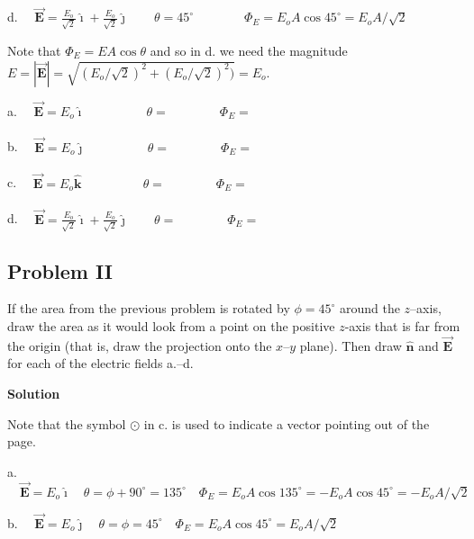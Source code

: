 \documentclass{article}
\newcommand{\ds}[0]{\displaystyle}
\newcommand{\ihat}[0]{\hat{\boldsymbol{\imath}}}
\newcommand{\jhat}[0]{\hat{\boldsymbol{\jmath}}}
\newcommand{\khat}[0]{\hat{\boldsymbol{k}}}
\newcommand{\bfvec}[1]{\vec{\mathbf{#1}}}
\begin{document}
\begin{enumerate}
        d. $\quad\ds\bfvec{E}=\frac{E_o}{\sqrt{2}}\ihat + \frac{E_o}{\sqrt{2}}\jhat\qquad\theta=45^\circ\qquad\qquad\Phi_E=E_o A\cos 45^\circ=E_oA/\sqrt{2}$

        Note that $\Phi_E=EA\cos\theta$ and so in d. we need the magnitude $E = |\bfvec{E}| = \sqrt{(E_o/\sqrt{2})^2+(E_o/\sqrt{2})^2)}=E_o$.
        \else

        

        a. $\quad\ds\bfvec{E}=E_o\ihat\qquad\phantom{+\frac{E_o}{\sqrt{2}}\jhat}\theta=\qquad\qquad\Phi_E=$

        b. $\quad\ds\bfvec{E}=E_o\jhat\qquad\phantom{+ \frac{E_o}{\sqrt{2}}\jhat}\theta=\qquad\qquad\Phi_E=$ 

        c. $\quad\ds\bfvec{E}=E_o\khat\qquad\phantom{+\frac{E_o}{\sqrt{2}}\jhat}\theta=\qquad\qquad\Phi_E=$ 

        d. $\quad\ds\bfvec{E}=\frac{E_o}{\sqrt{2}}\ihat + \frac{E_o}{\sqrt{2}}\jhat\qquad\theta=\qquad\qquad\Phi_E=$

        \newpage
        \fi

\end{enumerate}

\subsection{Problem II}

\ifsolutions

\else


\fi

If the area from the previous problem is rotated by $\phi=45^\circ$ around the $z$--axis, draw the area as it would look from a point on the positive $z$-axis that is far from the origin (that is, draw the projection onto the $x$--$y$ plane). Then draw $\hat{\mathbf{n}}$ and $\bfvec{E}$ for each of the electric fields a.--d.

\ifsolutions
\textbf{Solution} 

Note that the symbol $\odot$ in c. is used to indicate a vector pointing out of the page.



a. $\quad\ds\bfvec{E}=E_o\ihat\quad\theta=\phi+90^\circ=135^\circ\quad\Phi_E=E_oA\cos 135^\circ=-E_oA\cos 45^\circ=-E_oA/\sqrt{2}$

b. $\quad\ds\bfvec{E}=E_o\jhat\quad\theta=\phi=45^\circ\quad\Phi_E=E_oA\cos 45^\circ=E_oA/\sqrt{2}$ 
\end{document}
